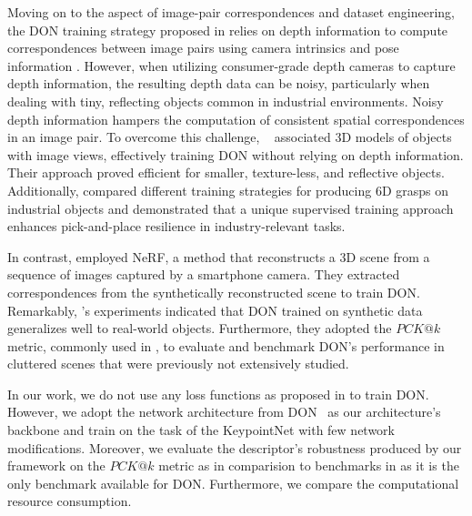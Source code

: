 Moving on to the aspect of image-pair correspondences and dataset engineering,
the DON training strategy proposed in \cite{florence2018dense, florence2020dense} relies on depth information to
compute correspondences between image pairs using camera intrinsics and pose information \cite{hartley2003multiple}.
However, when utilizing consumer-grade depth cameras to capture depth information, the resulting depth data can be noisy,
particularly when dealing with tiny, reflecting objects common in industrial environments. Noisy depth information hampers
the computation of consistent spatial correspondences in an image pair. To overcome this challenge,
\citeauthor{kupcsik2021supervised}~\cite{kupcsik2021supervised} associated 3D models of objects with image views,
effectively training DON without relying on depth information. Their approach proved efficient for smaller,
texture-less, and reflective objects. Additionally, \citeauthor{kupcsik2021supervised}
compared different training strategies for producing 6D grasps on industrial objects and
demonstrated that a unique supervised training approach enhances pick-and-place resilience in industry-relevant tasks.

In contrast, \citeauthor{nerf-Supervision}\cite{nerf-Supervision} employed NeRF\cite{mildenhall2021nerf},
a method that reconstructs a 3D scene from a sequence of images captured by a smartphone camera.
They extracted correspondences from the synthetically reconstructed scene to train DON. Remarkably,
\citeauthor{adrian2022efficient}'s experiments indicated that DON trained on synthetic data generalizes
well to real-world objects. Furthermore, they adopted the $PCK@k$ metric, commonly used in
\parencites{chai2019multi}{fathy2018hierarchical}, to evaluate and benchmark DON's performance
in cluttered scenes that were previously not extensively studied.

In our work, we do not use any loss functions as proposed in \parencites{florence2018dense}{florence2020dense}{kupcsik2021supervised}{adrian2022efficient}{hadjivelichkov2021fully}{nerf-Supervision}
to train DON. However, we adopt the network architecture from DON~\cite{florence2018dense}
as our architecture's backbone and train on the task of the KeypointNet\parencites{suwajanakorn2018discovery}{zhao2020learning}
with few network modifications. Moreover, we evaluate the descriptor's robustness produced by our framework on the $PCK@k$ metric as in comparision
to benchmarks in \cite{adrian2022efficient} as it is the only benchmark available for DON. Furthermore, we compare the computational resource consumption.